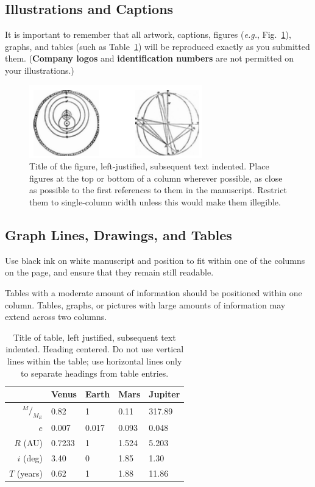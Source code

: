 \documentclass[]{iac}
\newcommand*\rfrac[2]{{{}^{#1}\!/_{#2}}} %
\begin{document}
\subsection{Illustrations and Captions}
It is important to remember that all artwork, captions, figures (\textit{e.g.}, Fig.~\ref{fig:X}), graphs, and tables (such as Table~\ref{table:X}) will be reproduced exactly as you submitted them. (\textbf{Company logos} and \textbf{identification numbers} are not permitted on your illustrations.)

\begin{figure}
    \includegraphics[width=\columnwidth]{examplefigure.png}
    \caption{\label{fig:X}Title of the figure, left-justified, subsequent text indented. Place figures at the top or bottom of a column wherever possible, as close as possible to the first references to them in the manuscript. Restrict them to single-column width unless this would make them illegible.}
\end{figure}

\subsection{Graph Lines, Drawings, and Tables}
Use black ink on white manuscript and position to fit within one of the columns on the page, and ensure that they remain still readable.

Tables with a moderate amount of information should be positioned within one column. Tables, graphs, or pictures with large amounts of information may extend across two columns.

\begin{table}
    \begin{tabular}{rllll}
        \toprule
        & Venus & Earth & Mars & Jupiter \\
        \midrule
        $\rfrac{M}{M_E}$	& 0.82 		& 1 		& 0.11 		& 317.89	\\
        $e$					& 0.007		& 0.017		& 0.093		& 0.048		\\
        $R$ (AU)			& 0.7233	& 1			& 1.524		& 5.203		\\
        $i$ (deg)			& 3.40		& 0			& 1.85		& 1.30		\\
        $T$ (years)			& 0.62		& 1			& 1.88		& 11.86		\\
        \bottomrule
    \end{tabular}
    \caption{\label{table:X}Title of table, left justified, subsequent text indented. Heading centered. Do not use vertical lines within the table; use horizontal lines only to separate headings from table entries.}
\end{table}
\end{document}
